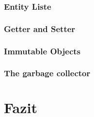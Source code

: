 		\subsubsection{Entity Liste}
		\subsubsection{Getter and Setter}
		\subsubsection{Immutable Objects}
		\subsubsection{The garbage collector}
\section{Fazit}